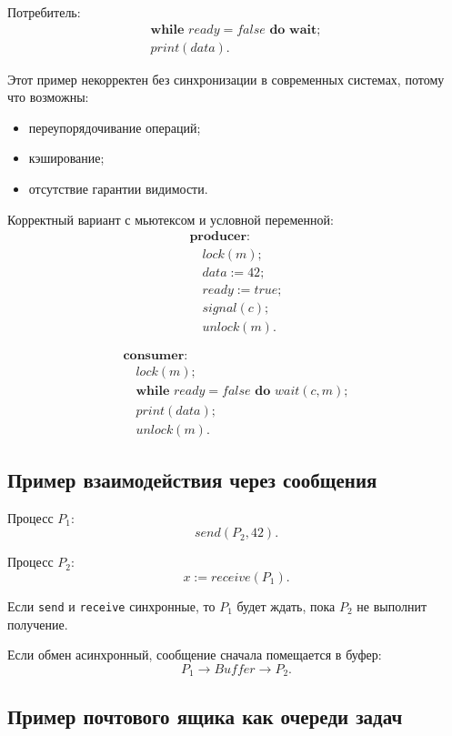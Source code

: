 \documentclass[12pt,a4paper]{article}
\begin{document}
Потребитель:
\[
\begin{array}{l}
\textbf{while } ready = false \textbf{ do wait};\\
print(data).
\end{array}
\]

Этот пример некорректен без синхронизации в современных системах, потому что возможны:
\begin{itemize}
    \item переупорядочивание операций;
    \item кэширование;
    \item отсутствие гарантии видимости.
\end{itemize}

Корректный вариант с мьютексом и условной переменной:
\[
\begin{array}{l}
\textbf{producer:}\\
\quad lock(m);\\
\quad data := 42;\\
\quad ready := true;\\
\quad signal(c);\\
\quad unlock(m).
\end{array}
\]

\[
\begin{array}{l}
\textbf{consumer:}\\
\quad lock(m);\\
\quad \textbf{while } ready = false \textbf{ do } wait(c,m);\\
\quad print(data);\\
\quad unlock(m).
\end{array}
\]

\subsection{Пример взаимодействия через сообщения}

Процесс $P_1$:
\[
send(P_2, 42).
\]

Процесс $P_2$:
\[
x := receive(P_1).
\]

Если \texttt{send} и \texttt{receive} синхронные, то $P_1$ будет ждать, пока $P_2$ не выполнит получение.

Если обмен асинхронный, сообщение сначала помещается в буфер:
\[
P_1 \rightarrow Buffer \rightarrow P_2.
\]

\subsection{Пример почтового ящика как очереди задач}
\end{document}
